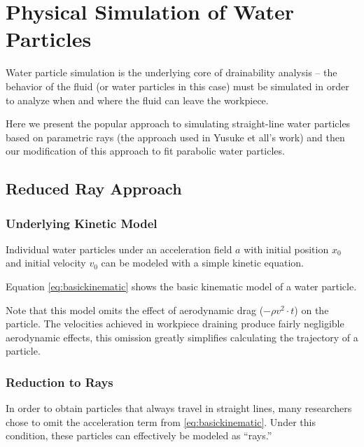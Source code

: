 						\chapter{Physical Simulation of Water Particles}

Water particle simulation is the underlying core of drainability analysis -- the behavior of the fluid (or water particles in this case) must be simulated in order to analyze when and where the fluid can leave the workpiece.

Here we present the popular approach to simulating straight-line water particles based on parametric rays (the approach used in Yusuke et all's work) and then our modification of this approach to fit parabolic water particles.

\section{Reduced Ray Approach}

	\subsection{Underlying Kinetic Model}

Individual water particles under an acceleration field $a$ with initial position $x_0$ and initial velocity $v_0$ can be modeled with a simple kinetic equation.


Equation \eqref{eq:basickinematic} shows the basic kinematic model of a water particle.


Note that this model omits the effect of aerodynamic drag ($-\rho v^2 \cdot t$) on the particle. The velocities achieved in workpiece draining produce fairly negligible aerodynamic effects, this omission greatly simplifies calculating the trajectory of a particle.

	\subsection{Reduction to Rays}

In order to obtain particles that always travel in straight lines, many researchers chose to omit the acceleration term from \eqref{eq:basickinematic}. Under this condition, these particles can effectively be modeled as ``rays.''


